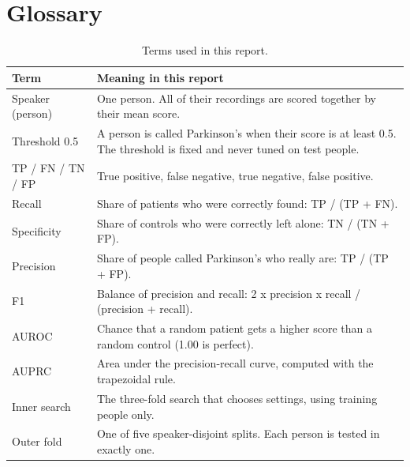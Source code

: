 \documentclass[11pt,a4paper]{article}
\begin{document}
\section*{Glossary}
\begin{table}[H]\centering\small\renewcommand{\arraystretch}{1.15}
\caption{Terms used in this report.}
\begin{tabular}{p{4.2cm}p{11.8cm}}
\toprule
\textbf{Term} & \textbf{Meaning in this report}\\
\midrule
Speaker (person) & One person. All of their recordings are scored together by their mean score.\\
Threshold 0.5 & A person is called Parkinson's when their score is at least 0.5. The threshold is fixed and never tuned on test people.\\
TP / FN / TN / FP & True positive, false negative, true negative, false positive.\\
Recall & Share of patients who were correctly found: TP / (TP + FN).\\
Specificity & Share of controls who were correctly left alone: TN / (TN + FP).\\
Precision & Share of people called Parkinson's who really are: TP / (TP + FP).\\
F1 & Balance of precision and recall: 2 x precision x recall / (precision + recall).\\
AUROC & Chance that a random patient gets a higher score than a random control (1.00 is perfect).\\
AUPRC & Area under the precision-recall curve, computed with the trapezoidal rule.\\
Inner search & The three-fold search that chooses settings, using training people only.\\
Outer fold & One of five speaker-disjoint splits. Each person is tested in exactly one.\\
\bottomrule
\end{tabular}\end{table}
\end{document}
